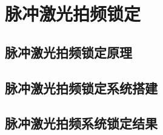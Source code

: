 
\chapter[脉冲激光拍频锁定]{脉冲激光拍频锁定}

\section[脉冲激光拍频锁定原理]{脉冲激光拍频锁定原理}

\section[脉冲激光拍频锁定系统搭建]{脉冲激光拍频锁定系统搭建}

\section[脉冲激光拍频系统锁定结果]{脉冲激光拍频系统锁定结果}

